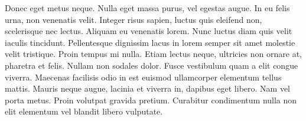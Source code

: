 \documentclass[10pt,oneside]{article}
\begin{document}
Donec eget metus neque. Nulla eget massa purus, vel egestas augue. In eu felis urna, non venenatis velit. Integer risus sapien, luctus quis eleifend non, scelerisque nec lectus. Aliquam eu venenatis lorem. Nunc luctus diam quis velit iaculis tincidunt. Pellentesque dignissim lacus in lorem semper sit amet molestie velit tristique. Proin tempus mi nulla. Etiam lectus neque, ultricies non ornare at, pharetra et felis. Nullam non sodales dolor. Fusce vestibulum quam a elit congue viverra. Maecenas facilisis odio in est euismod ullamcorper elementum tellus mattis. Mauris neque augue, lacinia et viverra in, dapibus eget libero. Nam vel porta metus. Proin volutpat gravida pretium. Curabitur condimentum nulla non elit elementum vel blandit libero vulputate. \cite{book_d}



\end{document}
